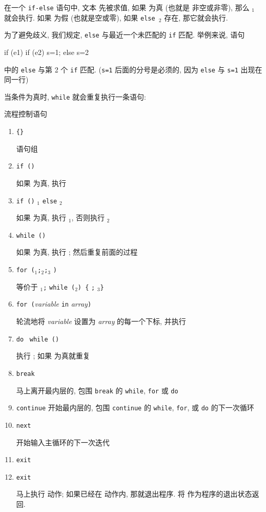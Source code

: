 在一个 \verb'if-else' 语句中, 文本 \expr 先被求值, 如果 \expr 为真 (也就是
非空或非零), 那么 \stmt$_1$ 就会执行. 如果 \expr 为假 (也就是空或零),
如果 \verb'else '\stmt$_2$ 存在, 那它就会执行.

为了避免歧义, 我们规定, \verb'else' 与最近一个未匹配的 \verb'if' 匹配.
举例来说, 语句
\begin{awkcode}
    if (e1) if (e2) s=1; else s=2
\end{awkcode}
中的 \verb'else' 与第 2 个 \verb'if' 匹配. (\verb's=1' 后面的分号是必须的,
因为 \verb'else' 与 \verb's=1' 出现在同一行)

当条件为真时, \verb'while' 就会重复执行一条语句:
\begin{summary}{流程控制语句}
    \begin{enumerate}
        \item \verb'{'\stmt\verb'}' \par
            语句组
        \item \verb'if ('\expr\verb')'\stmt \par
            如果 \expr 为真, 执行 \stmt
        \item \verb'if ('\expr\verb')' \stmt$_1$ \verb'else' \stmt$_2$ \par
            如果 \expr 为真, 执行 \stmt$_1$, 否则执行 \stmt$_2$
        \item \verb'while ('\expr\verb')' \stmt \par
            如果 \expr 为真, 执行 \stmt; 然后重复前面的过程
        \item \verb'for ('\expr$_1$\verb';'\expr$_2$\verb';'\expr$_3$
            \verb')' \stmt \par
            等价于 \expr$_1$\verb';' \verb'while ('\expr$_2$\verb') {'
            \stmt\verb';' \expr$_3$\verb'}'
        \item \verb'for ('\textit{variable} \verb'in'
            \textit{array}\verb')' \stmt \par
            轮流地将 \textit{variable} 设置为 \textit{array} 的每一个下标,
            并执行 \stmt
        \item \verb'do' \stmt\ \verb'while ('\expr\verb')' \par
            执行 \stmt; 如果 \expr 为真就重复
        \item \verb'break' \par
            马上离开最内层的, 包围 \verb'break' 的 \verb'while',
            \verb'for' 或 \verb'do'
        \item \verb'continue'
            开始最内层的, 包围 \verb'continue' 的 \verb'while', \verb'for',
            或 \verb'do' 的下一次循环
        \item \verb'next' \par
            开始输入主循环的下一次迭代
        \item \verb'exit'
        \item \verb'exit' \expr \par
            马上执行 \END 动作; 如果已经在 \END 动作内, 那就退出程序.
            将 \expr 作为程序的退出状态返回.
    \end{enumerate}
\end{summary}
